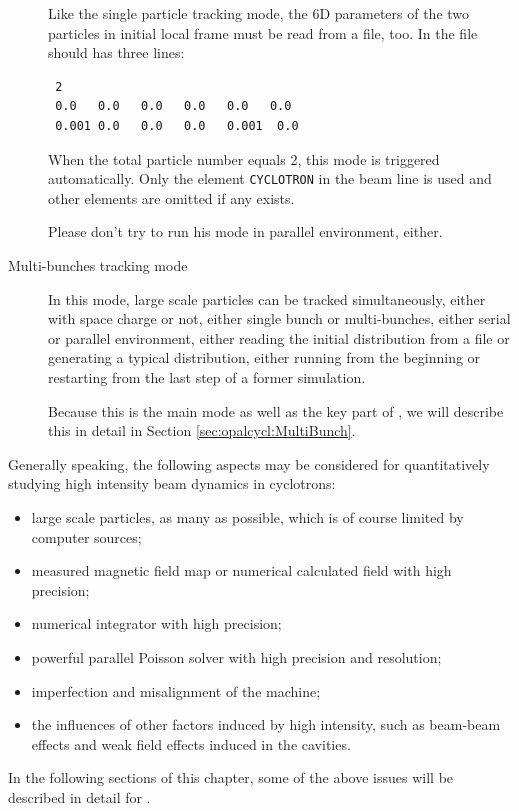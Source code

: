 \begin{description}
  Like the single particle tracking mode, 
  the 6D parameters of the two particles in initial local frame must be read from a file, too.
  In the file should has three lines:
\begin{verbatim}
 2
 0.0   0.0   0.0   0.0   0.0   0.0  
 0.001 0.0   0.0   0.0   0.001  0.0    
\end{verbatim}

When the total particle number equals 2, this mode is triggered automatically.
Only the element \texttt{CYCLOTRON} in the beam line is used and other elements are omitted if any exists.

Please don't try to run his mode in parallel environment, either.


\item[Multi-bunches tracking mode]

  In this mode, large scale particles can be tracked simultaneously, either with space charge or not, 
  either single bunch or multi-bunches, either serial or parallel environment, 
  either reading the initial distribution from a file or generating a typical distribution,  
  either running from the beginning or restarting from the last step of a former simulation.

  Because this is the main mode as well as the key part of \opalcycl, 
  we will describe this in detail in Section \ref{sec:opalcycl:MultiBunch}.

\end{description}  
  
Generally speaking, the following aspects may be considered for quantitatively studying high intensity beam dynamics in cyclotrons:
  \begin{itemize}
  \item large scale particles, as many as possible, which is of course limited by computer sources;
  \item measured magnetic field map or numerical calculated field with high precision;
  \item numerical integrator with high precision;
  \item powerful parallel Poisson solver with high precision and resolution;
  \item imperfection and misalignment of the machine;
  \item the influences of other factors induced by high intensity, such as beam-beam effects and weak field effects induced in the cavities. 
  \end{itemize}
  In the following sections of this chapter, some of the above issues will be described in detail for \opalcycl.


